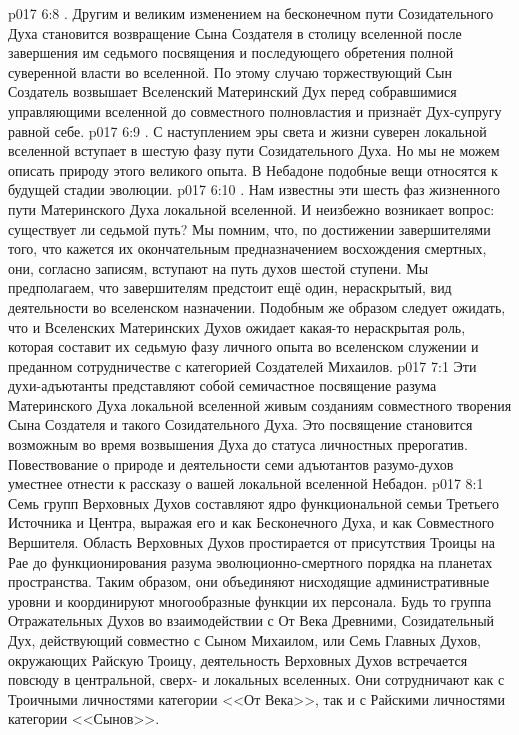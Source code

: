 \vs p017 6:8 . Другим и великим изменением на бесконечном пути Созидательного Духа становится возвращение Сына Создателя в столицу вселенной после завершения им седьмого посвящения и последующего обретения полной суверенной власти во вселенной. По этому случаю торжествующий Сын Создатель возвышает Вселенский Материнский Дух перед собравшимися управляющими вселенной до совместного полновластия и признаёт Дух\hyp{}супругу равной себе.
\vs p017 6:9 . С наступлением эры света и жизни суверен локальной вселенной вступает в шестую фазу пути Созидательного Духа. Но мы не можем описать природу этого великого опыта. В Небадоне подобные вещи относятся к будущей стадии эволюции.
\vs p017 6:10 . Нам известны эти шесть фаз жизненного пути Материнского Духа локальной вселенной. И неизбежно возникает вопрос: существует ли седьмой путь? Мы помним, что, по достижении завершителями того, что кажется их окончательным предназначением восхождения смертных, они, согласно записям, вступают на путь духов шестой ступени. Мы предполагаем, что завершителям предстоит ещё один, нераскрытый, вид деятельности во вселенском назначении. Подобным же образом следует ожидать, что и Вселенских Материнских Духов ожидает какая\hyp{}то нераскрытая роль, которая составит их седьмую фазу личного опыта во вселенском служении и преданном сотрудничестве с категорией Создателей Михаилов.
\vs p017 7:1 Эти духи\hyp{}адъютанты представляют собой семичастное посвящение разума Материнского Духа локальной вселенной живым созданиям совместного творения Сына Создателя и такого Созидательного Духа. Это посвящение становится возможным во время возвышения Духа до статуса личностных прерогатив. Повествование о природе и деятельности семи адъютантов разумо\hyp{}духов уместнее отнести к рассказу о вашей локальной вселенной Небадон.
\vs p017 8:1 Семь групп Верховных Духов составляют ядро функциональной семьи Третьего Источника и Центра, выражая его и как Бесконечного Духа, и как Совместного Вершителя. Область Верховных Духов простирается от присутствия Троицы на Рае до функционирования разума эволюционно\hyp{}смертного порядка на планетах пространства. Таким образом, они объединяют нисходящие административные уровни и координируют многообразные функции их персонала. Будь то группа Отражательных Духов во взаимодействии с От Века Древними, Созидательный Дух, действующий совместно с Сыном Михаилом, или Семь Главных Духов, окружающих Райскую Троицу, деятельность Верховных Духов встречается повсюду в центральной, сверх\hyp{} и локальных вселенных. Они сотрудничают как с Троичными личностями категории <<От Века>>, так и с Райскими личностями категории <<Сынов>>.
